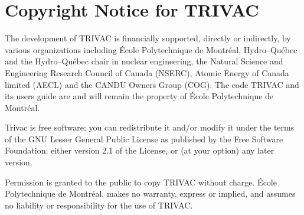 \section*{Copyright Notice for TRIVAC}

The development of TRIVAC is financially supported, directly or indirectly, by various
organizations including \'{E}cole Polytechnique de Montr\'{e}al, Hydro--Qu\'{e}bec and the
Hydro--Qu\'{e}bec chair in nuclear engineering, the Natural Science and Engineering Research
Council of Canada (NSERC), Atomic Energy of Canada limited (AECL) and the CANDU Owners Group (COG).
The code TRIVAC and its users guide are and will remain the property of
\'{E}cole Polytechnique de Montr\'{e}al.

\vskip 0.15cm

Trivac is free software; you can redistribute it and/or
modify it under the terms of the GNU Lesser General Public
License as published by the Free Software Foundation; either
version 2.1 of the License, or (at your option) any later version.

\vskip 0.15cm

Permission is granted to the public to copy TRIVAC without charge. \'{E}cole Polytechnique de
Montr\'{e}al, makes no warranty, express or implied, and assumes no liability or  responsibility
for the use of TRIVAC.
